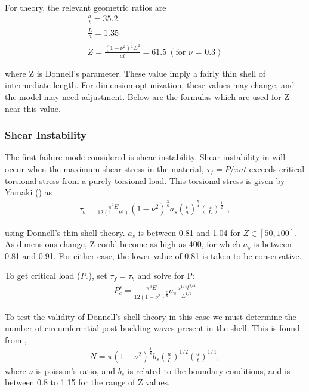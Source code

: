 \documentclass{report}
\begin{document}
For theory, the relevant geometric ratios are
\begin{eqnarray}
\frac{a}{t} = 35.2 \\
\frac{L}{a} = 1.35 \\
Z = \frac{(1-\nu^2)^\frac{1}{2}L^2}{at} = 61.5 \ (\text{for $\nu$ = 0.3})
\end{eqnarray}

where Z is Donnell's parameter. These value imply a fairly thin shell of intermediate length. For dimension optimization, these values may change, and the model may need adjustment. Below are the formulas which are used for Z near this value.

\subsubsection{Shear Instability}

The first failure mode considered is shear instability. Shear instability in will occur when the maximum shear stress in the material, $\tau_{f} = P/\pi at$ exceeds critical torsional stress from a purely torsional load. This torsional stress is given by Yamaki (\cite{Yamaki1984}) as
\begin{eqnarray}
\tau_{b} = \frac{\pi^2E}{12(1-\nu^2)}(1-\nu^2)^{\frac{3}{8}}a_s\left(\frac{t}{a}\right)^{\frac{5}{4}}\left(\frac{a}{L}\right)^{\frac{1}{2}}~~,
\end{eqnarray}

using Donnell's thin shell theory. $a_{s}$ is between 0.81 and 1.04 for $Z \in [50,100]$. As dimensions change, Z could become as high as 400, for which $a_{s}$ is between 0.81 and 0.91. For either case, the lower value of 0.81 is taken to be conservative.

To get critical load ($P_{c}$), set $\tau_{f} = \tau_{b}$ and solve for P:
\begin{eqnarray}
P_{c}^{s} = \frac{\pi^3E}{12(1-\nu^2)^{\frac{5}{8}}}a_{s}\frac{a^{1/4}t^{9/4}}{L^{1/2}}
\end{eqnarray}

To test the validity of Donnell's shell theory in this case we must determine the number of circumferential post-buckling waves present in the shell. This is found from \cite{Yamaki1984},
\begin{eqnarray}
N = \pi(1-\nu^2)^{\frac{1}{8}}b_{s}\left(\frac{a}{L}\right)^{1/2}\left(\frac{a}{t}\right)^{1/4},
\end{eqnarray}
where $\nu$ is poisson's ratio, and $b_{s}$ is related to the boundary conditions, and is between 0.8 to 1.15 for the range of Z values.
\end{document}
